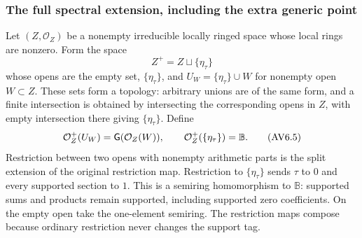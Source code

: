 \subsubsection{The full spectral extension, including the extra generic point}

Let $(Z,\mathcal O_Z)$ be a nonempty irreducible locally ringed space
whose local rings are nonzero. Form the space
\[
 Z^+=Z\sqcup\{\eta_\tau\}
 \tag{AV6.4}\label{eq:full-spectrum-space}
\]
whose opens are the empty set, $\{\eta_\tau\}$, and
$U_W=\{\eta_\tau\}\cup W$ for nonempty open $W\subset Z$.
These sets form a topology: arbitrary unions are of the same form,
and a finite intersection is obtained by intersecting the corresponding
opens in $Z$, with empty intersection there giving $\{\eta_\tau\}$.
Define
\[
 \mathcal O_Z^+(U_W)=\mathsf G(\mathcal O_Z(W)),\qquad
 \mathcal O_Z^+(\{\eta_\tau\})=\mathbb B.
 \tag{AV6.5}\label{eq:full-spectrum-sheaf}
\]
Restriction between two opens with nonempty arithmetic parts is the
split extension of the original restriction map. Restriction to
$\{\eta_\tau\}$ sends $\tau$ to $0$ and every supported section to $1$.
This is a semiring homomorphism to $\mathbb B$: supported sums and
products remain supported, including supported zero coefficients.
On the empty open take the one-element semiring. The restriction maps
compose because ordinary restriction never changes the support tag.

